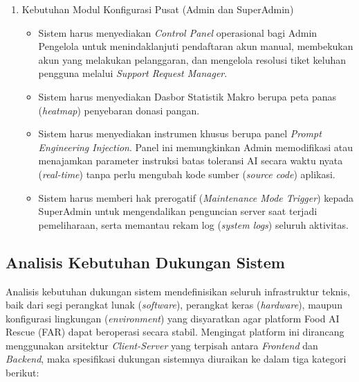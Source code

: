 \begin{enumerate}
    \item Kebutuhan Modul Konfigurasi Pusat (Admin dan SuperAdmin)
    \begin{itemize}
        \item Sistem harus menyediakan \textit{Control Panel} operasional bagi Admin Pengelola untuk menindaklanjuti pendaftaran akun manual, membekukan akun yang melakukan pelanggaran, dan mengelola resolusi tiket keluhan pengguna melalui \textit{Support Request Manager}.
        \item Sistem harus menyediakan Dasbor Statistik Makro berupa peta panas (\textit{heatmap}) penyebaran donasi pangan.
        \item Sistem harus menyediakan instrumen khusus berupa panel \textit{Prompt Engineering Injection}. Panel ini memungkinkan Admin memodifikasi atau menajamkan parameter instruksi batas toleransi AI secara waktu nyata (\textit{real-time}) tanpa perlu mengubah kode sumber (\textit{source code}) aplikasi.
        \item Sistem harus memberi hak prerogatif (\textit{Maintenance Mode Trigger}) kepada SuperAdmin untuk mengendalikan penguncian server saat terjadi pemeliharaan, serta memantau rekam log (\textit{system logs}) seluruh aktivitas.
    \end{itemize}
\end{enumerate}

\subsection{Analisis Kebutuhan Dukungan Sistem}
Analisis kebutuhan dukungan sistem mendefinisikan seluruh infrastruktur teknis, baik dari segi perangkat lunak (\textit{software}), perangkat keras (\textit{hardware}), maupun konfigurasi lingkungan (\textit{environment}) yang disyaratkan agar platform Food AI Rescue (FAR) dapat beroperasi secara stabil. Mengingat platform ini dirancang menggunakan arsitektur \textit{Client-Server} yang terpisah antara \textit{Frontend} dan \textit{Backend}, maka spesifikasi dukungan sistemnya diuraikan ke dalam tiga kategori berikut:

